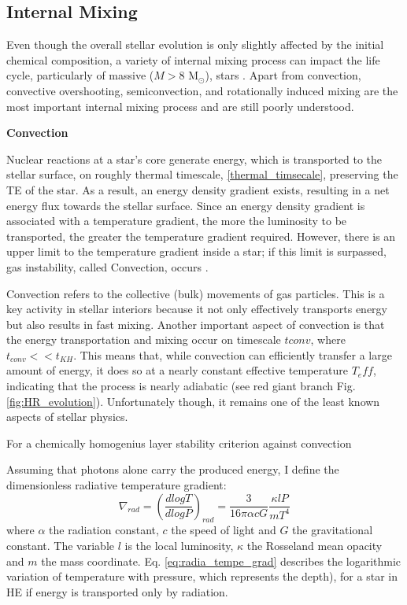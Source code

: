 \subsection{Internal Mixing}\label{sub:mixing}

Even though the overall stellar evolution is only slightly affected by the initial chemical composition, a variety of internal mixing process can impact the life cycle, particularly of massive ($M>8$ M$_{\odot}$), stars \citep{langer2012presupernova}. Apart from convection, convective overshooting, semiconvection, and rotationally induced mixing are the most important internal mixing process \citep{schootemeijer2019constraining} and are still poorly understood. 

{\bf Convection}

Nuclear reactions at a star's core generate energy,
which is transported to the stellar surface, on roughly thermal timescale, \eqref{thermal_timsecale}, preserving the TE of the star. As a result, an energy density gradient exists, resulting in a net energy flux towards the stellar surface. Since an energy density gradient is associated with a temperature gradient, the more the luminosity to be transported, the greater the temperature gradient required. However, there is an upper limit to the temperature gradient inside a star; if this limit is surpassed, gas instability, called Convection, occurs \cite{pols2011stellar}. 

Convection refers to the collective (bulk) movements of gas particles. This is a key activity in stellar interiors because it not only effectively transports energy but also results in fast mixing. Another important aspect of convection is that the energy transportation and mixing occur on timescale $t{conv}$, where $t_{conv} << t_{KH}$. This means that, while convection can efficiently transfer a large amount of energy, it does so at a nearly constant effective temperature $T_eff$, indicating that the process is nearly adiabatic (see red giant branch Fig. \ref{fig:HR_evolution}). Unfortunately though, it remains one of the least known aspects of stellar physics.

For a chemically homogenius layer stability criterion against convection


Assuming that photons alone carry the produced energy, I define the dimensionless radiative temperature gradient:
\begin{equation}
    \nabla_{rad} = \left ( \frac{d logT}{d logP} \right)_{rad} = \frac{3}{16 \pi \alpha c G} \frac{\kappa l P}{m T^4}
\end{equation}\label{eq:radia_tempe_grad}
where $\alpha$ the radiation constant, $c$ the speed of light and $G$ the gravitational constant. The variable $l$ is the local luminosity, $\kappa$ the Rosseland mean opacity and $m$ the mass coordinate. Eq. \eqref{eq:radia_tempe_grad} describes the logarithmic variation of temperature with pressure, which represents the depth), for a star in HE if energy is transported only by radiation.


